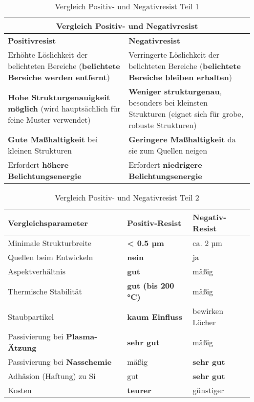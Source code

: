 \documentclass{article} %
\begin{document}
\begin{table}[htb!]
    \centering
    \renewcommand{\arraystretch}{1.5} %
    \begin{tabular}{|p{6cm}|p{6cm}|}
        \hline
        \multicolumn{2}{|c|}{\textbf{Vergleich Positiv- und Negativresist}} \\ \hline
        \textbf{Positivresist} & \textbf{Negativresist} \\ \hline
        Erhöhte Löslichkeit der belichteten Bereiche (\textbf{belichtete Bereiche werden entfernt}) & Verringerte Löslichkeit der belichteten Bereiche (\textbf{belichtete Bereiche bleiben erhalten}) \\
        \textbf{Hohe Strukturgenauigkeit möglich} (wird hauptsächlich für feine Muster verwendet) & \textbf{Weniger strukturgenau}, besonders bei kleinsten Strukturen (eignet sich für grobe, robuste Strukturen) \\
        \textbf{Gute Maßhaltigkeit} bei kleinen Strukturen & \textbf{Geringere Maßhaltigkeit} da sie zum Quellen neigen \\
        Erfordert \textbf{höhere Belichtungsenergie} & Erfordert \textbf{niedrigere Belichtungsenergie} \\ \hline
    \end{tabular}
    \captionsetup{labelfont=bf} %
    \caption{Vergleich Positiv- und Negativresist Teil 1 \cite{madou2002, wolf2000}}
    \label{tab:Vergleich Positiv- und Negativresist Teil 1}
\end{table}

\begin{table}[htb!]
    \centering
    \renewcommand{\arraystretch}{1.5} %
    \begin{tabular}{|p{6cm}|p{3cm}|p{3cm}|}
        \hline
        \textbf{Vergleichsparameter} & \textbf{Positiv-Resist} & \textbf{Negativ-Resist} \\ \hline
        Minimale Strukturbreite & \textbf{< 0.5 µm} & ca. 2 µm \\ \hline
        Quellen beim Entwickeln & \textbf{nein} & ja \\ \hline
        Aspektverhältnis & \textbf{gut} & mäßig \\ \hline
        Thermische Stabilität & \textbf{gut (bis 200 °C)} & mäßig \\ \hline
        Staubpartikel & \textbf{kaum Einfluss} & bewirken Löcher \\ \hline
        Passivierung bei \textbf{Plasma-Ätzung} & \textbf{sehr gut} & mäßig \\ \hline
        Passivierung bei \textbf{Nasschemie} & mäßig & \textbf{sehr gut} \\ \hline
        Adhäsion (Haftung) zu Si & gut & \textbf{sehr gut} \\ \hline
        Kosten & \textbf{teurer} & günstiger \\ \hline
    \end{tabular}
    \captionsetup{labelfont=bf} %
    \caption{Vergleich Positiv- und Negativresist Teil 2 \cite{madou2002, wolf2000}}
    \label{tab:Vergleich Positiv- und Negativresist Teil 2}
\end{table}  
\end{document}
